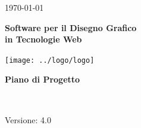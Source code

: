 \usepackage{multirow}
\title{\TITOLODOC}
\author{Dal Bosco Davide}



\renewcommand{\insertversion}{4.0} %
\renewcommand{\TITOLODOC}{Piano di Progetto} %
\renewcommand{\glosspath}{.\glossario} %

\begin{titlepage}
\begin{center}
	\begin{Large}	\today \end{Large}
\end{center}

\vspace{20pt}

\begin{center}
	\begin{Huge}
				\textbf{\ajax}
	\end{Huge}
\end{center}			

\begin{center}
	\begin{large}
				\textbf{Software per il Disegno Grafico\\ in Tecnologie Web}
	\end{large}
\end{center}			

\vspace{20pt}

\begin{center}
\texttt{[image: ../logo/logo]}
\end{center}

\vspace{170pt}
\begin{center} %
	\begin{Huge}
				\textbf{\TITOLODOC}
	\end{Huge}
			\\
\end{center}
\vspace{190pt}
\begin{center}
Versione: \insertversion
\end{center}
\end{titlepage}

\newpage

